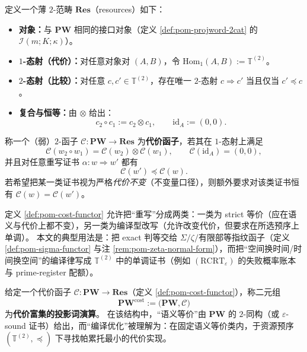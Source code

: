 \begin{definition}\label{def:pom-cost-functor}
定义一个薄 \(2\)-范畴 \(\mathbf{Res}\)（resources）如下：
\begin{itemize}
  \item \textbf{对象：}与 \(\mathbf{PW}\) 相同的接口对象（定义 \ref{def:pom-projword-2cat} 的 \(\mathcal{I}(m;K;\kappa)\)）。
  \item \textbf{\(1\)-态射（代价）：}对任意对象对 \((A,B)\)，令 \(\mathrm{Hom}_1(A,B):=\mathbb{T}^{(2)}\)。
  \item \textbf{\(2\)-态射（比较）：}对任意 \(c,c'\in\mathbb{T}^{(2)}\)，存在唯一 \(2\)-态射
  \(
  c\Rightarrow c'
  \)
  当且仅当 \(c'\preceq c\)。
  \item \textbf{复合与恒等：}由 \(\otimes\) 给出：
  \[
  c_2\circ c_1:=c_2\otimes c_1,
  \qquad
  \mathrm{id}_A:=(0,0).
  \]
\end{itemize}
称一个（弱）\(2\)-函子 \(\mathcal{C}:\mathbf{PW}\to \mathbf{Res}\) 为\textbf{代价函子}，若其在 \(1\)-态射上满足
\[
\mathcal{C}(w_2\circ w_1)=\mathcal{C}(w_2)\otimes \mathcal{C}(w_1),
\qquad
\mathcal{C}(\mathrm{id}_A)=(0,0),
\]
并且对任意重写证书 \(\alpha:w\Rightarrow w'\) 都有
\[
\mathcal{C}(w')\preceq \mathcal{C}(w).
\]
若希望把某一类证书视为严格\emph{代价不变}（不变量口径），则额外要求对该类证书恒有 \(\mathcal{C}(w)=\mathcal{C}(w')\)。
\end{definition}

\begin{remark}[不变量与单调量的分层]\label{rem:pom-cost-invariant-vs-monotone}
定义 \ref{def:pom-cost-functor} 允许把“重写”分成两类：一类为 strict 等价（应在语义与代价上都不变），另一类为编译型改写（允许改变代价，但要求在所选预序上单调）。
本文的典型用法是：把 exact 判等交给 \(\Sigma/\zeta/\)有限部等指纹函子（定义 \ref{def:pom-sigma-functor} 与注 \ref{rem:pom-zeta-normal-form}），而把“空间换时间/时间换空间”的编译律写成 \(\mathbb{T}^{(2)}\) 中的单调证书（例如 \((\mathrm{RCRT}_\varepsilon)\) 的失败概率账本与 prime-register 配额）。
\end{remark}

\begin{definition}\label{def:pom-pw-cost}
给定一个代价函子 \(\mathcal{C}:\mathbf{PW}\to\mathbf{Res}\)（定义 \ref{def:pom-cost-functor}），称二元组
\[
\mathbf{PW}^{\mathrm{cost}}:=\bigl(\mathbf{PW},\mathcal{C}\bigr)
\]
为\textbf{代价富集的投影词演算}。
在该结构中，“语义等价”由 \(\mathbf{PW}\) 的 \(2\)-同构（或 \(\varepsilon\)-sound 证书）给出，而“编译优化”被理解为：在固定语义等价类内，于资源预序 \((\mathbb{T}^{(2)},\preceq)\) 下寻找帕累托最小的代价实现。
\end{definition}

